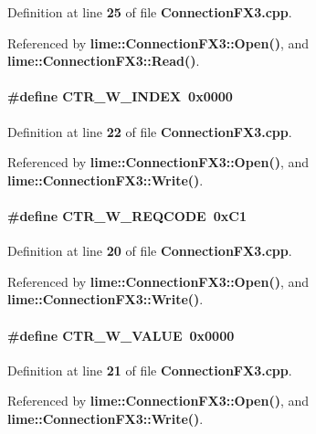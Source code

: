 Definition at line {\bf 25} of file {\bf Connection\+F\+X3.\+cpp}.



Referenced by {\bf lime\+::\+Connection\+F\+X3\+::\+Open()}, and {\bf lime\+::\+Connection\+F\+X3\+::\+Read()}.

\paragraph[{C\+T\+R\+\_\+\+W\+\_\+\+I\+N\+D\+EX}]{\setlength{\rightskip}{0pt plus 5cm}\#define C\+T\+R\+\_\+\+W\+\_\+\+I\+N\+D\+EX~0x0000}\label{ConnectionFX3_8cpp_a5000f2c888f14d97bf4f0a3397aa2a60}


Definition at line {\bf 22} of file {\bf Connection\+F\+X3.\+cpp}.



Referenced by {\bf lime\+::\+Connection\+F\+X3\+::\+Open()}, and {\bf lime\+::\+Connection\+F\+X3\+::\+Write()}.

\paragraph[{C\+T\+R\+\_\+\+W\+\_\+\+R\+E\+Q\+C\+O\+DE}]{\setlength{\rightskip}{0pt plus 5cm}\#define C\+T\+R\+\_\+\+W\+\_\+\+R\+E\+Q\+C\+O\+DE~0x\+C1}\label{ConnectionFX3_8cpp_a78e78313e15aea6d7ea25df4e8c8d893}


Definition at line {\bf 20} of file {\bf Connection\+F\+X3.\+cpp}.



Referenced by {\bf lime\+::\+Connection\+F\+X3\+::\+Open()}, and {\bf lime\+::\+Connection\+F\+X3\+::\+Write()}.

\paragraph[{C\+T\+R\+\_\+\+W\+\_\+\+V\+A\+L\+UE}]{\setlength{\rightskip}{0pt plus 5cm}\#define C\+T\+R\+\_\+\+W\+\_\+\+V\+A\+L\+UE~0x0000}\label{ConnectionFX3_8cpp_a04a504abc14b562bf641cc5c1687c2a9}


Definition at line {\bf 21} of file {\bf Connection\+F\+X3.\+cpp}.



Referenced by {\bf lime\+::\+Connection\+F\+X3\+::\+Open()}, and {\bf lime\+::\+Connection\+F\+X3\+::\+Write()}.

